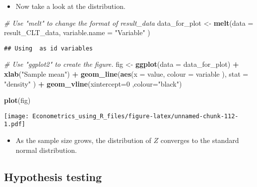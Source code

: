 \documentclass[]{book}
\newenvironment{Shaded}{\begin{snugshade}}{\end{snugshade}}
\newcommand{\KeywordTok}[1]{\textcolor[rgb]{0.13,0.29,0.53}{\textbf{#1}}}
\newcommand{\DataTypeTok}[1]{\textcolor[rgb]{0.13,0.29,0.53}{#1}}
\newcommand{\DecValTok}[1]{\textcolor[rgb]{0.00,0.00,0.81}{#1}}
\newcommand{\StringTok}[1]{\textcolor[rgb]{0.31,0.60,0.02}{#1}}
\newcommand{\CommentTok}[1]{\textcolor[rgb]{0.56,0.35,0.01}{\textit{#1}}}
\newcommand{\OperatorTok}[1]{\textcolor[rgb]{0.81,0.36,0.00}{\textbf{#1}}}
\newcommand{\NormalTok}[1]{#1}
\providecommand{\tightlist}{%
  \setlength{\itemsep}{0pt}\setlength{\parskip}{0pt}}
\begin{document}
\begin{itemize}
\tightlist
\item
  Now take a look at the distribution.
\end{itemize}

\begin{Shaded}
\begin{Highlighting}[]
\CommentTok{# Use "melt" to change the format of result_data}
\NormalTok{data_for_plot <-}\StringTok{ }\KeywordTok{melt}\NormalTok{(}\DataTypeTok{data =}\NormalTok{ result_CLT_data, }\DataTypeTok{variable.name =} \StringTok{"Variable"}\NormalTok{ )}
\end{Highlighting}
\end{Shaded}

\begin{verbatim}
## Using  as id variables
\end{verbatim}

\begin{Shaded}
\begin{Highlighting}[]
\CommentTok{# Use "ggplot2" to create the figure.}
\NormalTok{fig <-}\StringTok{ }
\StringTok{  }\KeywordTok{ggplot}\NormalTok{(}\DataTypeTok{data =}\NormalTok{ data_for_plot) }\OperatorTok{+}
\StringTok{  }\KeywordTok{xlab}\NormalTok{(}\StringTok{"Sample mean"}\NormalTok{) }\OperatorTok{+}\StringTok{ }
\StringTok{  }\KeywordTok{geom_line}\NormalTok{(}\KeywordTok{aes}\NormalTok{(}\DataTypeTok{x =}\NormalTok{ value, }\DataTypeTok{colour =}\NormalTok{ variable ),   }\DataTypeTok{stat =} \StringTok{"density"}\NormalTok{ ) }\OperatorTok{+}\StringTok{ }
\StringTok{  }\KeywordTok{geom_vline}\NormalTok{(}\DataTypeTok{xintercept=}\DecValTok{0}\NormalTok{ ,}\DataTypeTok{colour=}\StringTok{"black"}\NormalTok{)}

\KeywordTok{plot}\NormalTok{(fig)}
\end{Highlighting}
\end{Shaded}

\texttt{[image: Econometrics\_using\_R\_files/figure-latex/unnamed-chunk-112-1.pdf]}

\begin{itemize}
\tightlist
\item
  As the sample size grows, the distribution of \(Z\) converges to the
  standard normal distribution.
\end{itemize}

\subsection{Hypothesis testing}\label{hypothesis-testing-1}
\end{document}
